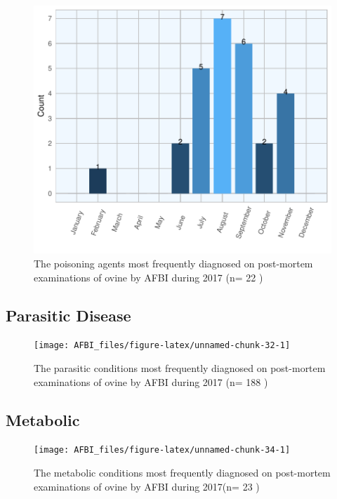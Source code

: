 \documentclass[]{book}
\begin{document}
\begin{figure}

{\centering \includegraphics{AFBI_files/figure-latex/unnamed-chunk-30-1} 

}

\caption{The poisoning agents most frequently diagnosed on post-mortem examinations of ovine  by AFBI during 2017 (n= 22 )}\label{fig:unnamed-chunk-30}
\end{figure}

\subsection{Parasitic Disease}\label{parasitic-disease}

\begin{figure}

{\centering \texttt{[image: AFBI\_files/figure-latex/unnamed-chunk-32-1]} 

}

\caption{The parasitic conditions most frequently diagnosed on post-mortem examinations of ovine by AFBI during 2017 (n= 188 )}\label{fig:unnamed-chunk-32}
\end{figure}

\subsection{Metabolic}\label{metabolic}

\begin{figure}

{\centering \texttt{[image: AFBI\_files/figure-latex/unnamed-chunk-34-1]} 

}

\caption{The metabolic conditions most frequently diagnosed on post-mortem examinations of ovine by AFBI during 2017(n= 23 )}\label{fig:unnamed-chunk-34}
\end{figure}
\end{document}
